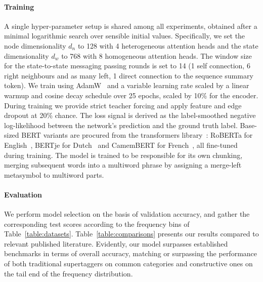 \paragraph{Training}
A single hyper-parameter setup is shared among all experiments, obtained after a minimal logarithmic search over sensible initial values.
Specifically, we set the node dimensionality $d_n$ to 128 with 4 heterogeneous attention heads and the state dimensionality $d_w$ to 768 with 8 homogeneous attention heads.
The window size for the state-to-state messaging passing rounds is set to 14 (1 self connection, 6 right neighbours and as many left, 1 direct connection to the sequence summary token).
We train using AdamW~\cite{	loshchilov2018decoupled} and a variable learning rate scaled by a linear warmup and cosine decay schedule over 25 epochs, scaled by 10\% for the encoder.
During training we provide strict teacher forcing and apply feature and edge dropout at 20\% chance.
The loss signal is derived as the label-smoothed negative log-likelihood between the network's prediction and the ground truth label.
Base-sized BERT variants are procured from the transformers library~\cite{wolf2020transformers}: RoBERTa for English~\cite{liu2019roberta}, BERTje for Dutch~\cite{de2019bertje} and CamemBERT for French~\cite{martin2020camembert}, all fine-tuned during training.
The model is trained to be responsible for its own chunking, merging subsequent words into a multiword phrase by assigning a merge-left metasymbol to multiword parts. 

\paragraph{Evaluation}
We perform model selection on the basis of validation accuracy, and gather the corresponding test scores according to the frequency bins of Table~\ref{table:datasets}.
Table~\ref{table:comparisons} presents our results compared to relevant published literature.
Evidently, our model surpasses established benchmarks in terms of overall accuracy, matching or surpassing the performance of both traditional supertaggers on common categories and constructive ones on the tail end of the frequency distribution.

